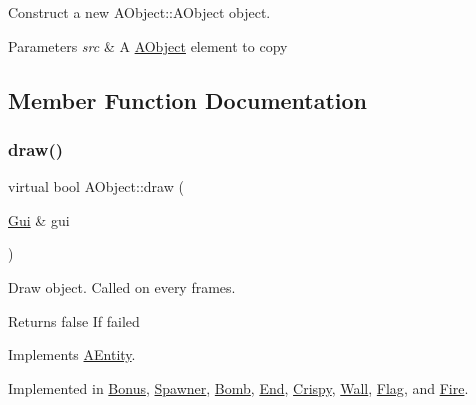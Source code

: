 Construct a new A\+Object\+::\+A\+Object object. 


\begin{DoxyParams}{Parameters}
{\em src} & A \hyperlink{class_a_object}{A\+Object} element to copy \\
\hline
\end{DoxyParams}


\subsection{Member Function Documentation}
\mbox{\label{class_a_object_a5e454e13e04ee937c20a465244cf748a}} 
\subsubsection{\texorpdfstring{draw()}{draw()}}
{\footnotesize\ttfamily virtual bool A\+Object\+::draw (\begin{DoxyParamCaption}\item[{\hyperlink{class_gui}{Gui} \&}]{gui }\end{DoxyParamCaption})\hspace{0.3cm}{\ttfamily [pure virtual]}}



Draw object. Called on every frames. 

\begin{DoxyReturn}{Returns}
false If failed 
\end{DoxyReturn}


Implements \hyperlink{class_a_entity_ad9404a7cae108eb81d881d256cacdc12}{A\+Entity}.



Implemented in \hyperlink{class_bonus_acdb40deca7be37984084fb3d4fef85ed}{Bonus}, \hyperlink{class_spawner_a1532fd875b6a3aacb617b1111b818f01}{Spawner}, \hyperlink{class_bomb_ae0ea4aa0ce14d353ad63c31cccc2a69d}{Bomb}, \hyperlink{class_end_aad5c7ef71927eddfd634e0a0879cb99a}{End}, \hyperlink{class_crispy_a266bebd70e55a7d08ba1688af0f4adf0}{Crispy}, \hyperlink{class_wall_ab3ea42b91f7830d22782901d61be505f}{Wall}, \hyperlink{class_flag_ae24cc9c0e3cc3378e12af9f40c0ee93d}{Flag}, and \hyperlink{class_fire_a622efdbee6254c463250b6d9033428eb}{Fire}.

\mbox{\label{class_a_object_ac4a82eef484c0f7bf3547a7f7f6dce7e}} 
